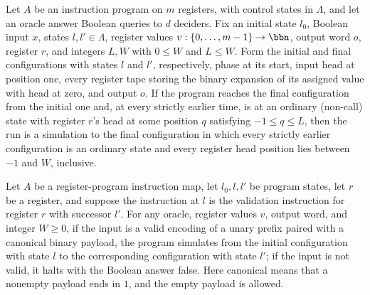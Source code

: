 \begin{lemma}
\label{Complexity.LogProg.simTo_of_reachesB}
\leanok
{}
Let $A$ be an instruction program on $m$ registers, with control states in $\Lambda$,
and let an oracle answer Boolean queries to $d$ deciders. Fix an initial state $l_0$,
Boolean input $x$, states $l,l'\in\Lambda$, register values $v:\{0,\ldots,m-1\}\to\bbn$,
output word $o$, register $r$, and integers $L,W$ with $0\le W$ and $L\le W$. Form the
initial and final configurations with states $l$ and $l'$, respectively, phase at its
start, input head at position one, every register tape storing the binary expansion of
its assigned value with head at zero, and output $o$. If the program reaches the final
configuration from the initial one and, at every strictly earlier time, is at an
ordinary (non-call) state with register $r$'s head at some position $q$ satisfying
$-1\le q\le L$, then the run is a simulation to the final configuration in which every
strictly earlier configuration is an ordinary state and every register head position
lies between $-1$ and $W$, inclusive.
\end{lemma}

\begin{lemma}
\label{Complexity.LogProg.sim_valP}
\leanok
{}
Let $A$ be a register-program instruction map, let $l_0,l,l'$ be program states, let $r$
be a register, and suppose the instruction at $l$ is the validation instruction for
register $r$ with successor $l'$. For any oracle, register values $v$, output word, and
integer $W\ge 0$, if the input is a valid encoding of a unary prefix paired with a
canonical binary payload, the program simulates from the initial configuration with
state $l$ to the corresponding configuration with state $l'$; if the input is not valid,
it halts with the Boolean answer false. Here canonical means that a nonempty payload
ends in $1$, and the empty payload is allowed.
\end{lemma}

